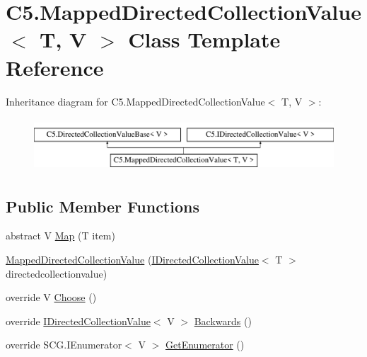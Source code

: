 \hypertarget{class_c5_1_1_mapped_directed_collection_value}{}\section{C5.\+Mapped\+Directed\+Collection\+Value$<$ T, V $>$ Class Template Reference}
\label{class_c5_1_1_mapped_directed_collection_value}
Inheritance diagram for C5.\+Mapped\+Directed\+Collection\+Value$<$ T, V $>$\+:\begin{figure}[H]
\begin{center}
\leavevmode
\includegraphics[height=2.000000cm]{class_c5_1_1_mapped_directed_collection_value}
\end{center}
\end{figure}
\subsection*{Public Member Functions}
\begin{DoxyCompactItemize}
\item 
abstract V \hyperlink{class_c5_1_1_mapped_directed_collection_value_a7e0ff3ab32d911463798583acbc1d131}{Map} (T item)
\item 
\hyperlink{class_c5_1_1_mapped_directed_collection_value_ac02fabc4e88f8b68a7caeb61df3d0a4e}{Mapped\+Directed\+Collection\+Value} (\hyperlink{interface_c5_1_1_i_directed_collection_value}{I\+Directed\+Collection\+Value}$<$ T $>$ directedcollectionvalue)
\item 
override V \hyperlink{class_c5_1_1_mapped_directed_collection_value_adc9edc21d6e4a9f2e5f026ae1d0525a9}{Choose} ()
\item 
override \hyperlink{interface_c5_1_1_i_directed_collection_value}{I\+Directed\+Collection\+Value}$<$ V $>$ \hyperlink{class_c5_1_1_mapped_directed_collection_value_a8eaadbb8ae6d18393c504361daec1c8c}{Backwards} ()
\item 
override S\+C\+G.\+I\+Enumerator$<$ V $>$ \hyperlink{class_c5_1_1_mapped_directed_collection_value_af0efdacb675d8a443b5e959b9982f5cb}{Get\+Enumerator} ()
\end{DoxyCompactItemize}

